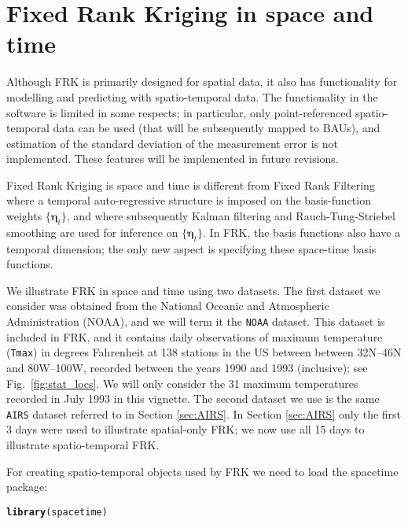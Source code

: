 \documentclass{article}\usepackage[]{graphicx}\usepackage[]{color}
\makeatletter
\newcommand{\hlstd}[1]{\textcolor[rgb]{0.345,0.345,0.345}{#1}}%
\newcommand{\hlkwd}[1]{\textcolor[rgb]{0.737,0.353,0.396}{\textbf{#1}}}%
\newenvironment{kframe}{%
 \def\at@end@of@kframe{}%
 \ifinner\ifhmode%
  \def\at@end@of@kframe{\end{minipage}}%
  \begin{minipage}{\columnwidth}%
 \fi\fi%
 \def\FrameCommand##1{\hskip\@totalleftmargin \hskip-\fboxsep
 \colorbox{shadecolor}{##1}\hskip-\fboxsep
     \hskip-\linewidth \hskip-\@totalleftmargin \hskip\columnwidth}%
 \MakeFramed {\advance\hsize-\width
   \@totalleftmargin\z@ \linewidth\hsize
   \@setminipage}}%
 {\par\unskip\endMakeFramed%
 \at@end@of@kframe}
\newenvironment{knitrout}{}{} %
\renewcommand{\tt} {\texttt}
\newcommand{\pkg}[1]{{\fontseries{b}\selectfont #1}}
\newcommand{\etab} {\boldsymbol{\eta}}
\makeatother
\begin{document}
\section{Fixed Rank Kriging in space and time}\label{sec:ST}

Although \pkg{FRK} is primarily designed for spatial data, it also has functionality for modelling and predicting with spatio-temporal data. The functionality in the software is limited in some respects; in particular, only point-referenced spatio-temporal data can be used (that will be subsequently mapped to BAUs), and estimation of the standard deviation of the measurement error is not implemented. These features will be implemented in future revisions.

Fixed Rank Kriging is space and time is different from Fixed Rank Filtering \citep{Cressie_2010} where a temporal auto-regressive structure is imposed on the basis-function weights $\{\etab_t \}$, and where subsequently Kalman filtering and Rauch-Tung-Striebel smoothing are used for inference on $\{\etab_t \}$. In FRK, the basis functions also have a temporal dimension; the only new aspect is specifying these space-time basis functions.

We illustrate FRK in space and time using two datasets. The first dataset we consider was obtained from the National Oceanic and Atmospheric Administration (NOAA), and we will term it the \tt{NOAA} dataset. This dataset is included in \pkg{FRK}, and it contains daily observations of maximum temperature (\tt{Tmax}) in degrees Fahrenheit at 138 stations in the US between between 32N--46N and 80W--100W, recorded between the years 1990 and 1993 (inclusive); see Fig.~\ref{fig:stat_locs}. We will only consider the 31 maximum temperatures recorded in July 1993 in this vignette. The second dataset we use is the same \tt{AIRS} dataset referred to in Section \ref{sec:AIRS}. In Section \ref{sec:AIRS} only the first 3 days were used to illustrate spatial-only FRK; we now use all 15 days to illustrate spatio-temporal FRK.

For creating spatio-temporal objects used by \pkg{FRK} we  need to load the \pkg{spacetime} package:

\begin{knitrout}
\color{fgcolor}\begin{kframe}
\begin{alltt}
\hlkwd{library}\hlstd{(spacetime)}
\end{alltt}
\end{kframe}
\end{knitrout}
\end{document}
